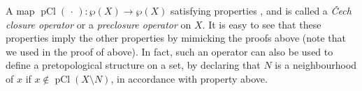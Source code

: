 \documentclass[article, a4paper, 11pt, oneside]{memoir}
\numberwithin{equation}{chapter}
\renewcommand{\powerset}[1]{\wp(#1)}
\newcommand{\pCl}[1]{\operatorname{pCl}(#1)}
\begin{document}
\begin{remark}
    A map $\pCl{\,\cdot\,} \colon \powerset{X} \to \powerset{X}$ satisfying properties ,  and  is called a \emph{\v{C}ech closure operator} or a \emph{preclosure operator} on $X$. It is easy to see that these properties imply the other properties by mimicking the proofs above (note that we used  in the proof of  above). In fact, such an operator can also be used to define a pretopological structure on a set, by declaring that $N$ is a neighbourhood of $x$ if $x \not\in \pCl{X \setminus N}$, in accordance with property  above.
\end{remark}
\end{document}
